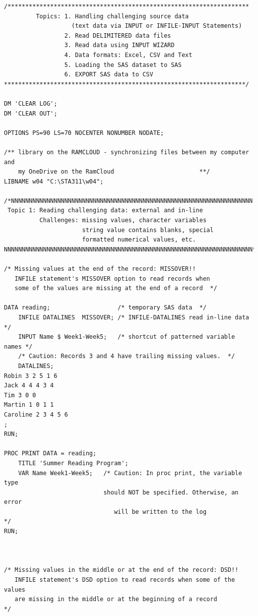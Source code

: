 \documentclass[
]{book}
\begin{document}
\begin{verbatim}
/********************************************************************
         Topics: 1. Handling challenging source data
                   (text data via INPUT or INFILE-INPUT Statements)
                 2. Read DELIMITERED data files
                 3. Read data using INPUT WIZARD
                 4. Data formats: Excel, CSV and Text
                 5. Loading the SAS dataset to SAS
                 6. EXPORT SAS data to CSV 
********************************************************************/

DM 'CLEAR LOG';
DM 'CLEAR OUT';

OPTIONS PS=90 LS=70 NOCENTER NONUMBER NODATE;

/** library on the RAMCLOUD - synchronizing files between my computer and 
    my OneDrive on the RamCloud                        **/
LIBNAME w04 "C:\STA311\w04";

/*NNNNNNNNNNNNNNNNNNNNNNNNNNNNNNNNNNNNNNNNNNNNNNNNNNNNNNNNNNNNNNNNNNNN
 Topic 1: Reading challenging data: external and in-line 
          Challenges: missing values, character variables
                      string value contains blanks, special
                      formatted numerical values, etc. 
NNNNNNNNNNNNNNNNNNNNNNNNNNNNNNNNNNNNNNNNNNNNNNNNNNNNNNNNNNNNNNNNNNNNNN*/

/* Missing values at the end of the record: MISSOVER!!
   INFILE statement's MISSOVER option to read records when
   some of the values are missing at the end of a record  */

DATA reading;                   /* temporary SAS data  */
    INFILE DATALINES  MISSOVER; /* INFILE-DATALINES read in-line data */
    INPUT Name $ Week1-Week5;   /* shortcut of patterned variable names */
    /* Caution: Records 3 and 4 have trailing missing values.  */
    DATALINES; 
Robin 3 2 5 1 6
Jack 4 4 4 3 4
Tim 3 0 0
Martin 1 0 1 1
Caroline 2 3 4 5 6
;
RUN;

PROC PRINT DATA = reading;
    TITLE 'Summer Reading Program';
    VAR Name Week1-Week5;   /* Caution: In proc print, the variable type
                            should NOT be specified. Otherwise, an error 
                               will be written to the log               */
RUN;



/* Missing values in the middle or at the end of the record: DSD!!
   INFILE statement's DSD option to read records when some of the values 
   are missing in the middle or at the beginning of a record          */


\end{verbatim}
\end{document}
